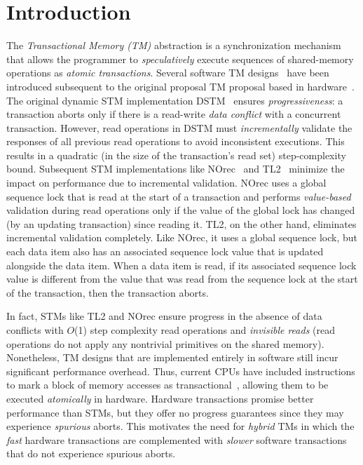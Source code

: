 \section{Introduction}
\label{sec:intro}
%
%
The \emph{Transactional Memory (TM)} abstraction is a synchronization mechanism 
that allows the programmer to \emph{speculatively} execute sequences of shared-memory
operations as \emph{atomic transactions}.
Several software TM designs~\cite{norec, ST95,HLM+03, astm, fraser} have been introduced subsequent to the original proposal TM proposal based in
hardware~\cite{HM93}. 
The original dynamic STM implementation DSTM~\cite{HLM+03} ensures \emph{progressiveness}: 
a transaction aborts only if there is a read-write \emph{data conflict} with a concurrent
transaction. However, read operations in DSTM must \emph{incrementally} validate
the responses of all previous read operations to avoid inconsistent executions. 
This results in a quadratic  (in the size of the transaction's read
set) step-complexity bound. Subsequent STM 
implementations like NOrec~\cite{norec} and TL2~\cite{DSS06}
minimize the impact on performance due to incremental validation.
NOrec uses a global sequence lock that is read at the start of a transaction and performs \emph{value-based}
validation during read operations only if the value of the global lock has changed (by an updating transaction) 
since reading it.
TL2, on the other hand, eliminates incremental validation completely.
Like NOrec, it uses a global sequence lock, but each data item also 
has an associated sequence lock value that is updated alongside the data item.
When a data item is read, if its associated sequence lock value is different 
from the value that was read from the sequence lock at the start of the transaction, then the transaction aborts.

In fact, STMs like TL2 and NOrec ensure progress in the absence of data conflicts with 
$O$(1) step complexity read operations and \emph{invisible reads} (read operations 
do not apply any nontrivial primitives on the shared memory).
Nonetheless, TM designs that are implemented entirely in software still incur significant performance overhead.
Thus, current CPUs have included instructions to mark a block of memory accesses as transactional~\cite{Rei12, asf, bluegene}, allowing them to be executed \emph{atomically} in hardware.
Hardware transactions promise better performance than STMs, but they offer no progress guarantees 
since they may experience 
\emph{spurious} aborts. This motivates the need for
\emph{hybrid} TMs in which the \emph{fast} hardware transactions are 
complemented with \emph{slower} software transactions that do not experience spurious aborts.

